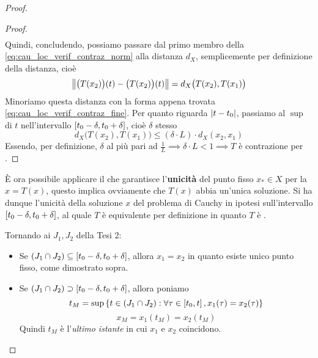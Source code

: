 \begin{theorem}
\begin{proof}
\begin{itemize}
\begin{proof}
\begin{align*}
			\end{align*}
			Quindi, concludendo, possiamo passare dal primo membro della \cref{eq:cau_loc_verif_contraz_norm} alla distanza $d_X$, semplicemente per definizione della distanza, cioè
			\[\left\|\bigl(T(x_2)\bigr)(t) - \bigl(T(x_2)\bigr)(t)\right\| = d_X\bigl(T(x_2),T(x_1)\bigr)\]
			Minoriamo questa distanza con la forma appena trovata \cref{eq:cau_loc_verif_contraz_fine}. Per quanto riguarda $\left|t-t_0\right|$, passiamo al $\sup$ di $t$ nell'intervallo $\left[t_0-\delta,t_0+\delta\right]$, cioè $\delta$ stesso
			\[d_X\bigl(T(x_2),T(x_1)\bigr) \leq (\delta \cdot L) \cdot d_X(x_2,x_1)\]
			Essendo, per definizione, $\delta$ al più pari ad $\frac{1}{L} \implies \delta\cdot L<1 \implies T$ è contrazione per .
			\end{proof}
		\end{itemize}
		È ora possibile applicare il  che garantisce l'\textbf{unicità} del punto fisso $x_* \in X$ per la $x = T(x)$, questo implica ovviamente che $T(x)$ abbia un'unica soluzione. Si ha dunque l'unicità della soluzione $x$ del problema di Cauchy in ipotesi sull'intervallo $\left[t_0-\delta,t_0+\delta\right]$, al quale $T$ è equivalente per definizione in quanto $T$ è .

		Tornando ai $J_1, J_2$ della Tesi 2:
		\begin{itemize}
			\item Se $(J_1 \cap J_2) \subseteq \left[t_0-\delta,t_0+\delta\right]$, allora $x_1 = x_2$ in quanto esiste unico punto fisso, come dimostrato sopra.
			\item Se $(J_1 \cap J_2) \supset \left[t_0-\delta,t_0+\delta\right]$, allora poniamo
				\begin{equation}
					t_M = \sup \left\{t \in (J_1 \cap J_2): \forall \tau \in \left[t_0,t\right], x_1(\tau)=x_2(\tau)\right\}\label{eq:cau_loc_tM_J1J2_supset}
				\end{equation}
				\[x_M = x_1(t_M) = x_2(t_M)\]
				Quindi $t_M$ è l'\textit{ultimo istante} in cui $x_1$ e $x_2$ coincidono.


\end{itemize}
\end{proof}
\end{theorem}
